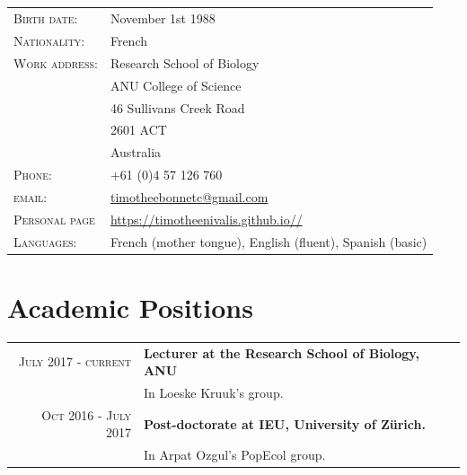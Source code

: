\documentclass[a4paper,10pt]{article} %
\begin{document}
\subsection*{}
\begin{tabular}{p{4cm} p{11cm}}
\hfill \textsc{Birth date:} & November 1st 1988\\
\hfill \textsc{Nationality:} & French\\
\hfill \textsc{Work address:} & Research School of Biology\\ 
									& ANU College of Science\\
									& 46 Sullivans Creek Road\\
									& 2601 ACT\\
									& Australia \\
\hfill \textsc{Phone:} & +61 (0)4 57 126 760\\
\hfill \textsc{email:} & \href{mailto:timotheebonnetc@gmail.com}{timotheebonnetc@gmail.com}\\
\hfill \textsc{Personal page} & \url{https://timotheenivalis.github.io//} \\
\hfill \textsc{Languages:} & French (mother tongue), English (fluent), Spanish (basic)
\end{tabular}

\section{Academic Positions}
\begin{tabular}{r|p{11cm}}
\textsc{July 2017 - current}  & \textbf{Lecturer at the Research School of Biology, ANU}\\
			      & \footnotesize{In Loeske Kruuk's group.}\\
\textsc{Oct 2016 - July 2017} & \textbf{Post-doctorate at IEU, University of Z\"urich.}\\
			      & \footnotesize{In Arpat Ozgul's PopEcol group.}
\end{tabular}
\end{document}
